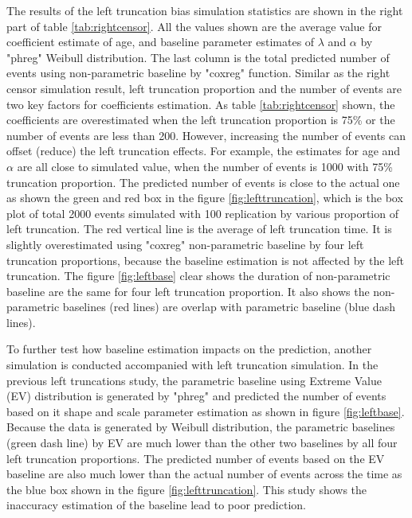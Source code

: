 \documentclass[12pt,letterpaper]{article}
\begin{document}
The results of the left truncation bias simulation statistics are shown in the right part of table \ref{tab:rightcensor}. All the values shown are the average value for coefficient estimate of age, and baseline parameter estimates of $\lambda$ and $\alpha$ by "phreg" Weibull distribution. The last column is the total predicted number of events using non-parametric baseline by "coxreg" function. Similar as the right censor simulation result, left truncation proportion and the number of events are two key factors for coefficients estimation. As table \ref{tab:rightcensor} shown, the coefficients are overestimated when the left truncation proportion is 75\% or the number of events are less than 200. However, increasing the number of events can offset (reduce) the left truncation effects. For example, the estimates for age and $\alpha$ are all close to simulated value, when the number of events is 1000 with 75\% truncation proportion. The predicted number of events is close to the actual one as shown the green and red box in the figure \ref{fig:lefttruncation}, which is the box plot of total 2000 events simulated with 100 replication by various proportion of left truncation. The red vertical line is the average of left truncation time. It is slightly overestimated using "coxreg" non-parametric baseline by four left truncation proportions, because the baseline estimation is not affected by the left truncation. The figure \ref{fig:leftbase} clear shows the duration of non-parametric baseline are the same for four left truncation proportion. It also shows the non-parametric baselines (red lines) are overlap with parametric baseline (blue dash lines).

To further test how baseline estimation impacts on the prediction, another simulation is conducted accompanied with left truncation simulation. In the previous left truncations study, the parametric baseline using Extreme Value (EV) distribution is generated by "phreg" and predicted the number of events based on it shape and scale parameter estimation as shown in figure \ref{fig:leftbase}. Because the data is generated by Weibull distribution, the parametric baselines (green dash line) by EV are much lower than the other two baselines by all four left truncation proportions. The predicted number of events based on the EV baseline are also much lower than the actual number of events across the time as the blue box shown in the figure \ref{fig:lefttruncation}. This study shows the inaccuracy estimation of the baseline lead to poor prediction.
\end{document}
